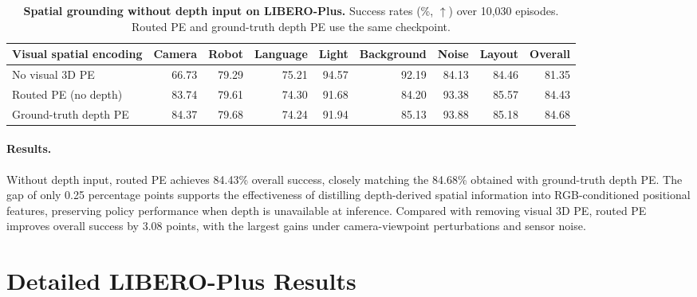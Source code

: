 \begin{table}[!htbp]
    \centering
    \footnotesize
    \setlength{\tabcolsep}{3pt}
    \renewcommand{\arraystretch}{1.15}
    \caption{\textbf{Spatial grounding without depth input on LIBERO-Plus.}
    Success rates (\%, $\uparrow$) over 10,030 episodes. Routed PE and
    ground-truth depth PE use the same checkpoint.}
    \label{tab:app:missing_depth}
    \begin{adjustbox}{max width=\linewidth}
    \begin{tabular}{@{}lrrrrrrrr@{}}
        \toprule
        Visual spatial encoding
        & Camera & Robot & Language & Light & Background & Noise & Layout & Overall \\
        \midrule
        No visual 3D PE
        & 66.73 & 79.29 & 75.21 & 94.57 & 92.19 & 84.13 & 84.46 & 81.35 \\
        Routed PE (no depth)
        & 83.74 & 79.61 & 74.30 & 91.68 & 84.20 & 93.38 & 85.57 & 84.43 \\
        \midrule
        Ground-truth depth PE
        & 84.37 & 79.68 & 74.24 & 91.94 & 85.13 & 93.88 & 85.18 & 84.68 \\
        \bottomrule
    \end{tabular}
    \end{adjustbox}
\end{table}

\paragraph{Results.}
Without depth input, routed PE achieves 84.43\% overall success,
closely matching the 84.68\% obtained with ground-truth depth PE.
The gap of only 0.25 percentage points supports the effectiveness of
distilling depth-derived spatial information into RGB-conditioned
positional features, preserving policy performance when depth is
unavailable at inference. Compared with removing visual 3D PE, routed
PE improves overall success by 3.08 points, with the largest gains
under camera-viewpoint perturbations and sensor noise.


\section{Detailed LIBERO-Plus Results}
\label{app:libero_plus}

